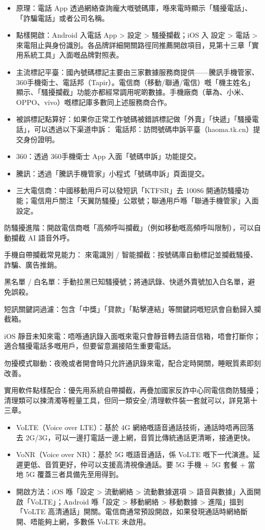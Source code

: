 \begin{itemize}
  \item 原理：電話 App 透過網絡查詢龐大嘅號碼庫，喺來電時顯示「騷擾電話」、「詐騙電話」或者公司名稱。
  \item 點樣開啟：Android 入電話 App > 設定 > 騷擾攔截；iOS 入 設定 > 電話 > 來電阻止與身份識別。各品牌詳細開關路徑同推薦開啟項目，見第十三章「實用系統工具」入面嘅品牌對照表。
  \item 主流標記平臺：國內號碼標記主要由三家數據服務商提供——騰訊手機管家、360手機衛士、電話邦（Tapir）。電信商（移動/聯通/電信）嘅「機主姓名」顯示、「騷擾攔截」功能亦都經常調用呢啲數據。手機廠商（華為、小米、OPPO、vivo）嘅標記庫多數同上述服務商合作。
  \item 被誤標記點算好：如果你正常工作號碼被錯誤標記做「外賣」「快遞」「騷擾電話」，可以透過以下渠道申訴： 電話邦：訪問號碼申訴平臺（haoma.tk.cn）提交身份證明。
  \item 360：透過 360手機衛士 App 入面「號碼申訴」功能提交。
  \item 騰訊：透過「騰訊手機管家」小程式「號碼申訴」頁面提交。
  \item 三大電信商：中國移動用戶可以發短訊「KTFSR」去 10086 開通防騷擾功能；電信用戶關注「天翼防騷擾」公眾號；聯通用戶喺「聯通手機管家」入面設定。
\end{itemize}

防騷擾進階：開啟電信商嘅「高頻呼叫攔截」（例如移動嘅高頻呼叫限制），可以自動攔截 AI 語音外呼。

手機自帶攔截常見能力： 來電識別 / 智能攔截：按號碼庫自動標記並攔截騷擾、詐騙、廣告推銷。

黑名單 / 白名單：手動拉黑已知騷擾號；將通訊錄、快遞外賣號加入白名單，避免誤殺。

短訊關鍵詞過濾：包含「中獎」「貸款」「點擊連結」等關鍵詞嘅短訊會自動歸入攔截箱。

iOS 靜音未知來電：唔喺通訊錄入面嘅來電只會靜音轉去語音信箱，唔會打斷你；適合騷擾電話多嘅用戶，但要留意漏接陌生重要電話。

勿擾模式聯動：夜晚或者開會時只允許通訊錄來電，配合定時開關，睡眠質素即刻改善。

實用軟件點樣配合：優先用系統自帶攔截，再疊加國家反詐中心同電信商防騷擾；清理類可以揀清濁等輕量工具，但同一類安全/清理軟件裝一套就可以，詳見第十三章。


\begin{itemize}
  \item VoLTE（Voice over LTE）：基於 4G 網絡嘅語音通話技術，通話時唔再回落去 2G/3G，可以一邊打電話一邊上網，音質比傳統通話更清晰，接通更快。
  \item VoNR（Voice over NR）：基於 5G 嘅語音通話，係 VoLTE 嘅下一代演進。延遲更低、音質更好，仲可以支援高清視像通話。要 5G 手機 + 5G 套餐 + 當地 5G 覆蓋三者具備先至用得到。
  \item 開啟方法：iOS 喺「設定 > 流動網絡 > 流動數據選項 > 語音與數據」入面開啟「VoLTE」；Android 喺「設定 > 移動網絡 > 移動數據 > 進階」搵到「VoLTE 高清通話」開關。電信商通常預設開啟，如果發現通話時網絡斷開、唔能夠上網，多數係 VoLTE 未啟用。
\end{itemize}

